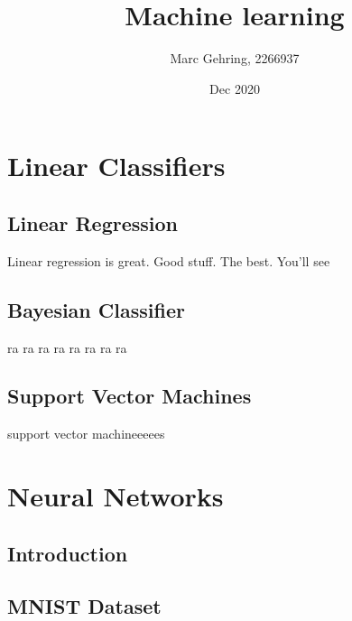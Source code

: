\documentclass{scrreprt}					%
\begin{document}
\titlehead{University of Applied Sciences Hamburg}%
\subject{Lab report}							%
\title{Machine learning}					%
\author{Marc Gehring, 2266937}			%
\date{Dec 2020}								%
\publishers{Prof. Dr. S. Hallerberg}	%
\maketitle


\tableofcontents

\chapter{Linear Classifiers}
\section{Linear Regression}
\label{sec:linregression}
Linear regression is great. Good stuff. The best. You'll see
\section{Bayesian Classifier}
\label{sec:bayesian}
ra ra ra ra ra ra ra ra
\section{Support Vector Machines}
\label{sec:svm}
support vector machineeeees
\chapter{Neural Networks}
\section{Introduction}
\section{MNIST Dataset}
\end{document}
